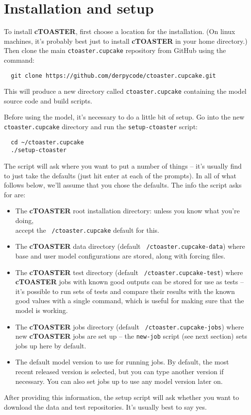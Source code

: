 \documentclass[a4paper,10pt,article]{memoir}
\begin{document}
\section{Installation and setup}

To install \textbf{cTOASTER}, first choose a location for the installation. (On linux machines, it's probably best just to install \textbf{cTOASTER} in your home directory.) Then clone the main \texttt{ctoaster.cupcake} repository from GitHub
using the command:
\begin{verbatim}
  git clone https://github.com/derpycode/ctoaster.cupcake.git
\end{verbatim}
This will produce a new directory called \texttt{ctoaster.cupcake} containing the model source code and build scripts.

Before using the model, it's necessary to do a little bit of setup.
Go into the new \texttt{ctoaster.cupcake} directory and run the
\texttt{setup-ctoaster} script:
\begin{verbatim}
  cd ~/ctoaster.cupcake
  ./setup-ctoaster
\end{verbatim}
The script will ask where you want to put a number of things -- it's usually find to just take the defaults (just hit enter at each of the prompts).  In all of what follows below, we'll assume that you chose the defaults. The
info the script asks for are:
\begin{itemize}
  \item{The \textbf{cTOASTER} root installation directory: unless you know what
    you're doing, 
    \\accept the \texttt{~/ctoaster.cupcake} default for this.}
  \item{The \textbf{cTOASTER} data directory (default \texttt{~/ctoaster.cupcake-data})
    where base and user model configurations are stored, along with
    forcing files.}
  \item{The \textbf{cTOASTER} test directory (default \texttt{~/ctoaster.cupcake-test})
    where \textbf{cTOASTER} jobs with known good outputs can be stored for use as
    tests -- it's possible to run sets of tests and compare their
    results with the known good values with a single command, which is
    useful for making sure that the model is working.}
  \item{The \textbf{cTOASTER} jobs directory (default \texttt{~/ctoaster.cupcake-jobs})
    where new \textbf{cTOASTER} jobs are set up -- the \texttt{new-job} script
    (see next section) sets jobs up here by default.}
  \item{The default model version to use for running jobs. 
    By default, the most recent released version is selected, 
    but you can  type another version if necessary. 
    You can also set jobs up to  use any model version later on.}
\end{itemize}
After providing this information, the setup script will ask whether you want to download the data and test repositories. It's usually best to say yes.
\end{document}
